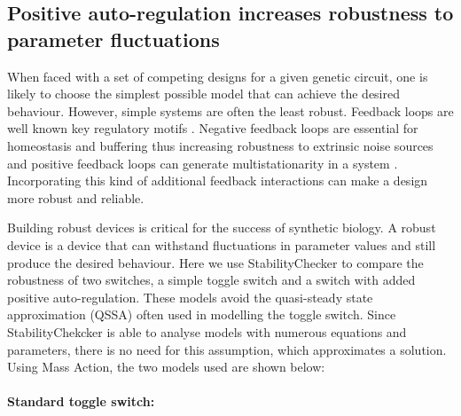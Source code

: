 \newpage
\subsection{Positive auto-regulation increases robustness to parameter fluctuations}

When faced with a set of competing designs for a given genetic circuit, one is likely to choose the simplest possible model that can achieve the desired behaviour. However, simple systems are often the least robust. Feedback loops are well known key regulatory motifs \autocite{Brandman:2005ci}. Negative feedback loops are essential for homeostasis and buffering \autocite{Thomas:1995id} thus increasing robustness to extrinsic noise sources and positive feedback loops can generate multistationarity in a system \autocite{Thomas:1995id}. Incorporating this kind of additional feedback interactions can make a design more robust and reliable. 

Building robust devices is critical for the success of synthetic biology. A robust device is a device that can withstand fluctuations in parameter values and still produce the desired behaviour. Here we use StabilityChecker to compare the robustness of two switches, a simple toggle switch and a switch with added positive auto-regulation. These models avoid the quasi-steady state approximation (QSSA) often used in modelling the toggle switch. Since StabilityChekcker is able to analyse models with numerous equations and parameters, there is no need for this assumption, which approximates a solution. Using Mass Action, the two models used are shown below:
\paragraph{Standard toggle switch:}
    
